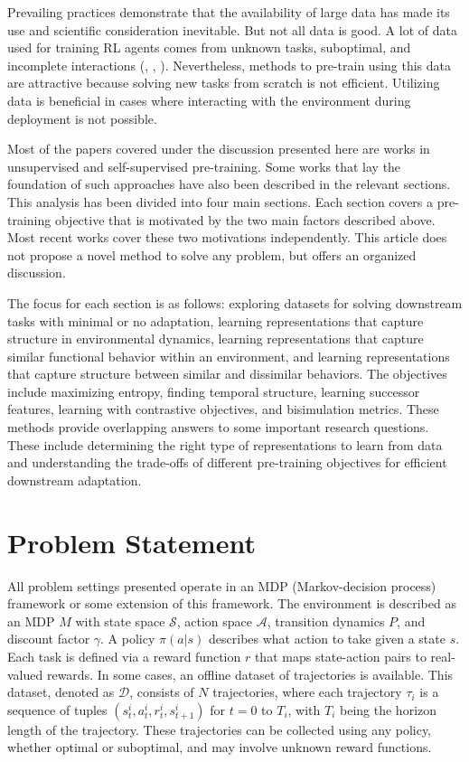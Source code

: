 \documentclass{article}
\begin{document}
Prevailing practices demonstrate that the availability of large data has made its use and scientific consideration inevitable. But not all data is good. A lot of data used for training RL agents comes from unknown tasks, suboptimal, and incomplete interactions (\cite{hansen2022bisimulation}, \cite{park2024foundation}, \cite{li2023accelerating}). Nevertheless, methods to pre-train using this data are attractive because solving new tasks from scratch is not efficient. Utilizing data is beneficial in cases where interacting with the environment during deployment is not possible. 

Most of the papers covered under the discussion presented here are works in unsupervised and self-supervised pre-training. Some works that lay the foundation of such approaches have also been described in the relevant sections. This analysis has been divided into four main sections. Each section covers a pre-training objective that is motivated by the two main factors described above. Most recent works cover these two motivations independently. This article does not propose a novel method to solve any problem, but offers an organized discussion.
 
The focus for each section is as follows: exploring datasets for solving downstream tasks with minimal or no adaptation, learning representations that capture structure in environmental dynamics, learning representations that capture similar functional behavior within an environment, and learning representations that capture structure between similar and dissimilar behaviors. The objectives include maximizing entropy, finding temporal structure, learning successor features, learning with contrastive objectives, and bisimulation metrics. These methods provide overlapping answers to some important research questions. These include determining the right type of representations to learn from data and understanding the trade-offs of different pre-training objectives for efficient downstream adaptation. 

\section{Problem Statement}

All problem settings presented operate in an MDP (Markov-decision process) framework or some extension of this framework. The environment is described as an MDP $M$ with state space $\mathcal{S}$, action space $\mathcal{A}$, transition dynamics $P$, and discount factor $\gamma$. A policy $\pi(a|s)$ describes what action to take given a state $s$. Each task is defined via a reward function $r$ that maps state-action pairs to real-valued rewards. In some cases, an offline dataset of trajectories is available. This dataset, denoted as $\mathcal{D}$, consists of $N$ trajectories, where each trajectory $\tau_i$ is a sequence of tuples $(s_t^i, a_t^i, r_t^i, s_{t+1}^i)$ for $t = 0$ to $T_i$, with $T_i$ being the horizon length of the trajectory. These trajectories can be collected using any policy, whether optimal or suboptimal, and may involve unknown reward functions.
\end{document}
